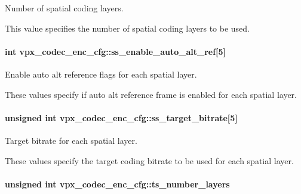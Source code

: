 Number of spatial coding layers. 

This value specifies the number of spatial coding layers to be used. 
\paragraph[{\texorpdfstring{ss\+\_\+enable\+\_\+auto\+\_\+alt\+\_\+ref}{ss_enable_auto_alt_ref}}]{\setlength{\rightskip}{0pt plus 5cm}int vpx\+\_\+codec\+\_\+enc\+\_\+cfg\+::ss\+\_\+enable\+\_\+auto\+\_\+alt\+\_\+ref\mbox{[}5\mbox{]}}\hypertarget{structvpx__codec__enc__cfg_a26e33bbfa43485c21ea58da6cee23c36}{}\label{structvpx__codec__enc__cfg_a26e33bbfa43485c21ea58da6cee23c36}


Enable auto alt reference flags for each spatial layer. 

These values specify if auto alt reference frame is enabled for each spatial layer. 
\paragraph[{\texorpdfstring{ss\+\_\+target\+\_\+bitrate}{ss_target_bitrate}}]{\setlength{\rightskip}{0pt plus 5cm}unsigned int vpx\+\_\+codec\+\_\+enc\+\_\+cfg\+::ss\+\_\+target\+\_\+bitrate\mbox{[}5\mbox{]}}\hypertarget{structvpx__codec__enc__cfg_a5ff2f5884109736d0c2464bc156fda1f}{}\label{structvpx__codec__enc__cfg_a5ff2f5884109736d0c2464bc156fda1f}


Target bitrate for each spatial layer. 

These values specify the target coding bitrate to be used for each spatial layer. 
\paragraph[{\texorpdfstring{ts\+\_\+number\+\_\+layers}{ts_number_layers}}]{\setlength{\rightskip}{0pt plus 5cm}unsigned int vpx\+\_\+codec\+\_\+enc\+\_\+cfg\+::ts\+\_\+number\+\_\+layers}\hypertarget{structvpx__codec__enc__cfg_a16d4549a30cbd585e3c3056ef873d8c7}{}\label{structvpx__codec__enc__cfg_a16d4549a30cbd585e3c3056ef873d8c7}


